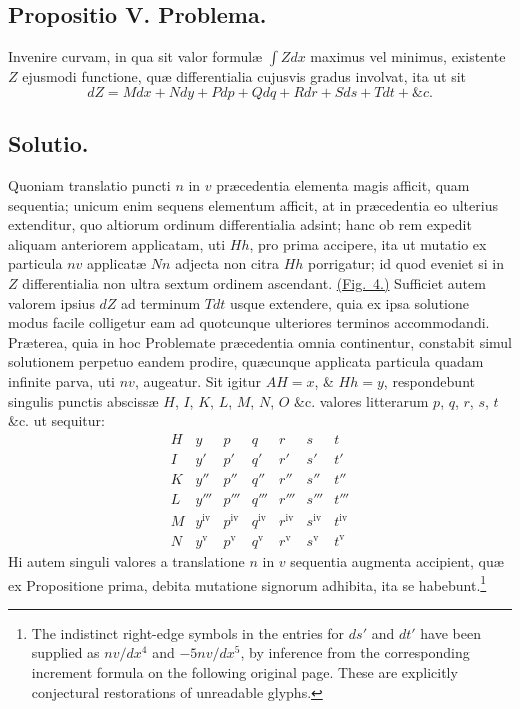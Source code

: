 \subsection*{Propositio V. Problema.}
Invenire curvam, in qua sit valor formulæ $\int Zdx$ maximus vel minimus, existente $Z$ ejusmodi functione, quæ differentialia cujusvis gradus involvat, ita ut sit
\[dZ=Mdx+Ndy+Pdp+Qdq+Rdr+Sds+Tdt+\&c.\]

\subsection*{Solutio.}
Quoniam translatio puncti $n$ in $v$ præcedentia elementa magis afficit, quam sequentia; unicum enim sequens elementum afficit, at in præcedentia eo ulterius extenditur, quo altiorum ordinum differentialia adsint; hanc ob rem expedit aliquam anteriorem applicatam, uti $Hh$, pro prima accipere, ita ut mutatio ex particula $nv$ applicatæ $Nn$ adjecta non citra $Hh$ porrigatur; id quod eveniet si in $Z$ differentialia non ultra sextum ordinem ascendant. \hyperlink{fig:4}{(Fig.~4.)} Sufficiet autem valorem ipsius $dZ$ ad terminum $Tdt$ usque extendere, quia ex ipsa solutione modus facile colligetur eam ad quotcunque ulteriores terminos accommodandi. Præterea, quia in hoc Problemate præcedentia omnia continentur, constabit simul solutionem perpetuo eandem prodire, quæcunque applicata particula quadam infinite parva, uti $nv$, augeatur. Sit igitur $AH=x$, \& $Hh=y$, respondebunt singulis punctis abscissæ $H$, $I$, $K$, $L$, $M$, $N$, $O$ \&c. valores litterarum $p$, $q$, $r$, $s$, $t$ \&c. ut sequitur:
\[
\begin{array}{c|cccccc}
H&y&p&q&r&s&t\\
I&y'&p'&q'&r'&s'&t'\\
K&y''&p''&q''&r''&s''&t''\\
L&y'''&p'''&q'''&r'''&s'''&t'''\\
M&y^{\mathrm{iv}}&p^{\mathrm{iv}}&q^{\mathrm{iv}}&r^{\mathrm{iv}}&s^{\mathrm{iv}}&t^{\mathrm{iv}}\\
N&y^{\mathrm{v}}&p^{\mathrm{v}}&q^{\mathrm{v}}&r^{\mathrm{v}}&s^{\mathrm{v}}&t^{\mathrm{v}}
\end{array}
\]
Hi autem singuli valores a translatione $n$ in $v$ sequentia augmenta accipient, quæ ex Propositione prima, debita mutatione signorum adhibita, ita se habebunt.\footnote{The indistinct right-edge symbols in the entries for $ds'$ and $dt'$ have been supplied as $nv/dx^4$ and $-5nv/dx^5$, by inference from the corresponding increment formula on the following original page. These are explicitly conjectural restorations of unreadable glyphs.}
